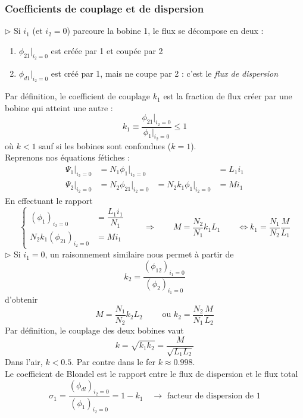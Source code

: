 		\subsubsection{Coefficients de couplage et de dispersion}
		$\triangleright$ Si $i_1$ (et $i_2=0$) parcoure la bobine 1, le flux se décompose en deux :
		\begin{enumerate}
		\item $\phi_{21}|_{i_2=0}$ est créée par 1 et coupée par 2
		\item $\phi_{d1}|_{i_2=0}$ est créé par 1, mais ne coupe par 2 : c'est le 
		\textit{flux de dispersion}
		\end{enumerate}
		Par définition, le coefficient de couplage $k_1$ est la fraction de flux 
		créer par une bobine qui atteint une autre :
		\begin{equation}
		k_1 \equiv \frac{\phi_{21}|_{i_2=0}}{\phi_1|_{i_2=0}}\leq 1
		\end{equation}
		où $k<1$ sauf si les bobines sont confondues ($k=1$).\\
		Reprenons nos équations fétiches :
		\begin{equation}
		\begin{array}{llll}
		\Psi_1|_{i_2=0} &= N_1\phi_1|_{i_2=0}& &= L_1i_1\\
		\Psi_2|_{i_2=0} &= N_2\phi_{21}|_{i_2=0}&= N_2k_1\phi_1|_{i_2=0} &= Mi_1		
		\end{array}
		\end{equation}
		En effectuant le rapport 
		\begin{equation}
		\left\{\begin{array}{ll}
		(\phi_1)_{i_2=0} &= \dfrac{L_1i_1}{N_1}\\
		N_2k_1(\phi_{21})_{i_2=0} &= Mi_1
		\end{array}\right.\qquad \Longrightarrow \qquad
		M = \frac{N_2}{N_1}k_1L_1\qquad \Leftrightarrow k_1 = \frac{N_1}{N_2}\frac{M}{L_1}
		\label{eq:3.23}
		\end{equation}
		$\triangleright$ Si $i_1=0$, un raisonnement similaire nous permet à partir de 
		\begin{equation}
		k_2 = \frac{(\phi_{12})_{i_1=0}}{(\phi_2)_{i_1=0}}
		\end{equation}
		d'obtenir 
		\begin{equation}
		M = \frac{N_1}{N_2}k_2L_2\qquad \text{ ou } k_2 = \frac{N_2}{N_1}\frac{M}{L_2}
		\end{equation}	
		Par définition, le couplage des deux bobines vaut
		\begin{equation}
		k = \sqrt{k_1k_2} = \frac{M}{\sqrt{L_1L_2}}
		\end{equation}
		Dans l'air, $k<0.5$. Par contre dans le fer $k \approx 0.998$.\\
		Le coefficient de Blondel est le rapport entre le flux de dispersion et le flux 
		total
		\begin{equation}
		\sigma_1 = \frac{(\phi_{dl})_{i_2=0}}{(\phi_1)_{i_2=0}} = 1-k_1\quad \rightarrow 
		\text{ facteur de dispersion de 1}
		\end{equation}
		
